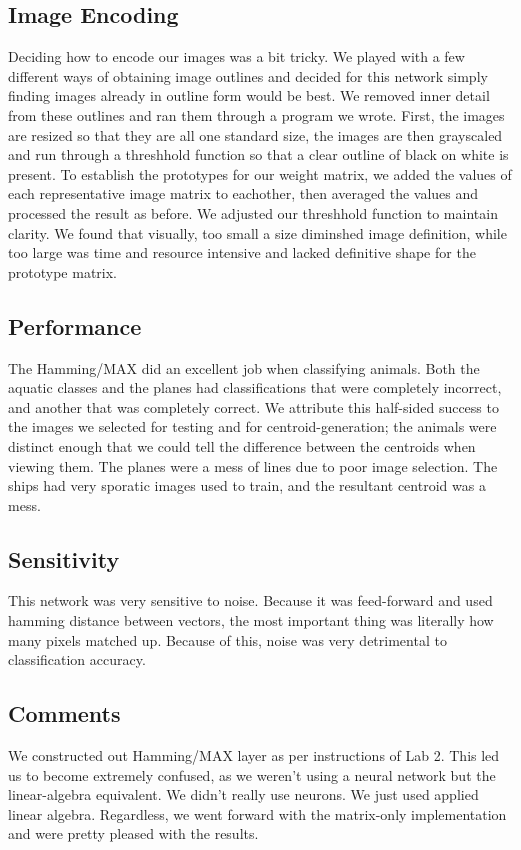 \documentclass{article}
\begin{document}
\subsection{Image Encoding}
Deciding how to encode our images was a bit tricky.  We played with a few different ways of obtaining image outlines and decided for this network simply finding images already in outline form would be best.  We removed inner detail from these outlines and ran them through a program we wrote.  First, the images are resized so that they are all one standard size,  the images are then grayscaled and run through a threshhold function so that a clear outline of black on white is present.  To establish the prototypes for our weight matrix, we added the values of each representative image matrix to eachother, then averaged the values and processed the result as before.  We adjusted our threshhold function to maintain clarity.  We found that visually, too small a size diminshed image definition, while too large was time and resource intensive and lacked definitive shape for the prototype matrix.

\subsection{Performance}
The Hamming/MAX did an excellent job when classifying animals. Both the aquatic classes and the planes had classifications that were completely incorrect, and another that was completely correct. We attribute this half-sided success to the images we selected for testing and for centroid-generation; the animals were distinct enough that we could tell the difference between the centroids when viewing them. The planes were a mess of lines due to poor image selection. The ships had very sporatic images used to train, and the resultant centroid was a mess. 
\subsection{Sensitivity}
This network was very sensitive to noise. Because it was feed-forward and used hamming distance between vectors, the most important thing was literally how many pixels matched up. Because of this, noise was very detrimental to classification accuracy.

\subsection{Comments}
We constructed out Hamming/MAX layer as per instructions of Lab 2. This led us to become extremely confused, as we weren't using a neural network but the linear-algebra equivalent. We didn't really use neurons. We just used applied linear algebra. Regardless, we went forward with the matrix-only implementation and were pretty pleased with the results. 
\end{document}
